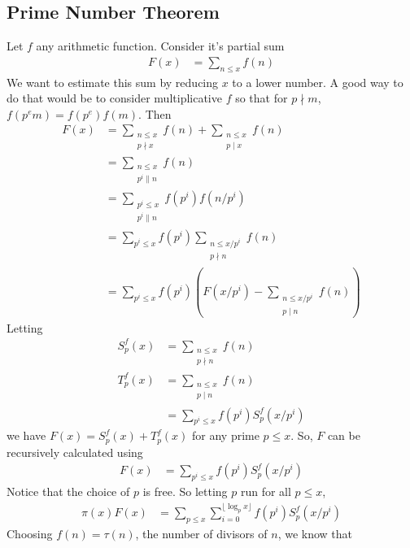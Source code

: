 \documentclass{article}
\theoremstyle{definition}
\begin{document}
	\subsection{Prime Number Theorem}
	Let $f$ any arithmetic function. Consider it's partial sum
		\begin{align*}
			F(x)
				& = \sum_{n\leq x}f(n)
		\end{align*}
	We want to estimate this sum by reducing $x$ to a lower number. A good way to do that would be to consider multiplicative $f$ so that for $p\nmid m$, $f(p^{e}m)=f(p^{e})f(m)$. Then
		\begin{align*}
			F(x)
				& = \sum_{\substack{n\leq x\\p\nmid x}}f(n)+\sum_{\substack{n\leq x\\p\mid x}}f(n)\\
				& = \sum_{\substack{n\leq x\\p^{i}\|n}}f(n)\\
				& = \sum_{\substack{p^{i}\leq x\\p^{i}\|n}}f(p^{i})f(n/p^{i})\\
				& = \sum_{p^{i}\leq x}f(p^{i})\sum_{\substack{n\leq x/p^{i}\\p\nmid n}}f(n)\\
				& = \sum_{p^{i}\leq x}f(p^{i})\left(F(x/p^{i})-\sum_{\substack{n\leq x/p^{i}\\p\mid n}}f(n)\right)
		\end{align*}
	Letting
		\begin{align*}
			S_{p}^{f}(x)
				& = \sum_{\substack{n\leq x\\p\nmid n}}f(n)\\
			T_{p}^{f}(x)
				& = \sum_{\substack{n\leq x\\p\mid n}}f(n)\\
				& = \sum_{p^{i}\leq x}f(p^{i})S_{p}^{f}(x/p^{i})
		\end{align*}
	we have $F(x)=S_{p}^{f}(x)+T_{p}^{f}(x)$ for any prime $p\leq x$. So, $F$ can be recursively calculated using
		\begin{align*}
			F(x)
				& = \sum_{p^{i}\leq x}f(p^{i})S_{p}^{f}(x/p^{i})
		\end{align*}
	Notice that the choice of $p$ is free. So letting $p$ run for all $p\leq x$,
		\begin{align*}
			\pi(x)F(x)
				& = \sum_{p\leq x}\sum_{i=0}^{\lfloor\log_{p}{x}\rfloor}f(p^{i})S_{p}^{f}(x/p^{i})
		\end{align*}
	Choosing $f(n)=\tau(n)$, the number of divisors of $n$, we know that
\end{document}
